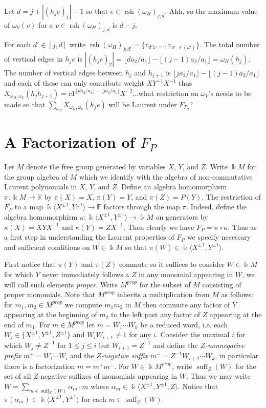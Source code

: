 \documentclass{amsart}
\newcommand{\FF}{\mathbb{F}}
\newcommand{\kk}{\Bbbk}
\newcommand{\KK}{\mathbb{K}}
\newcommand{\rsh}{\operatorname{rsh}}
\newcommand{\suff}{\operatorname{suff}}
\begin{document}
 Let $d=j+|(h_je)_1|-1$ so that $e\in\rsh(\omega_H)_{j;d}$.  Ahh, so the maximum value of $\omega_V(v)$ for a $v\in\rsh(\omega_H)_{j;d}$ is $d-j$.

 For each $d'\in[j,d]$ write $\rsh(\omega_H)_{j;d'}=\{v_{d'1},\ldots,v_{d',\ell(d')}\}$.  The total number of vertical edges in $h_je$ is $|(h_je)_2|=\lfloor da_2/a_1\rfloor-\lfloor (j-1)a_2/a_1\rfloor=\omega_H(h_j)$.  The number of vertical edges between $h_j$ and $h_{j+1}$ is $\lfloor ja_2/a_1\rfloor-\lfloor (j-1)a_2/a_1\rfloor$ and each of these can only contribute weight $XY^{-1}X^{-1}$ thus $X_{\omega_H,\omega_V}(h_jh_{j+1})=cY^{\lfloor da_2/a_1\rfloor-\lfloor ja_2/a_1\rfloor}X^{-2}$...what restriction on $\omega_V$'s needs to be made so that $\sum\limits_{\omega_V} X_{\omega_H,\omega_V}(h_je)$ will be Laurent under $F_{P_2}$?

 
 
\section{A Factorization of $F_P$}
 Let $M$ denote the free group generated by variables $X$, $Y$, and $Z$.  Write $\kk M$ for the group algebra of $M$ which we identify with the algebra of non-commutative Laurent polynomials in $X$, $Y$, and $Z$.  Define an algebra homomorphism $\pi:\kk M\to\KK$ by $\pi(X)=X$, $\pi(Y)=Y$, and $\pi(Z)=P(Y)$.  The restriction of $F_P$ to a map $\kk\langle X^{\pm1},Y^{\pm1}\rangle\to\FF$ factors through the map $\pi$.  Indeed, define the algebra homomorphism $\kappa:\kk\langle X^{\pm1},Y^{\pm1}\rangle\to\kk M$ on generators by $\kappa(X)=XYX^{-1}$ and $\kappa(Y)=ZX^{-1}$.  Then clearly we have $F_P=\pi\circ\kappa$.  Thus as a first step in understanding the Laurent properties of $F_P$ we specify necessary and sufficient conditions on $W\in\kk M$ so that $\pi(W)\in\kk\langle X^{\pm1},Y^{\pm1}\rangle$.  

 First notice that $\pi(Y)$ and $\pi(Z)$ commute so it suffices to consider $W\in\kk M$ for which $Y$ never immediately follows a $Z$ in any monomial appearing in $W$, we will call such elements \emph{proper}.  Write $M^{prop}$ for the subset of $M$ consisting of proper monomials.  Note that $M^{prop}$ inherits a multiplication from $M$ as follows: for $m_1,m_2\in M^{prop}$ we compute $m_1m_2$ in $M$ then commute any factor of $Y$ appearing at the beginning of $m_2$ to the left past any factor of $Z$ appearing at the end of $m_1$.  For $m\in M^{prop}$ let $m=W_1\cdots W_k$ be a reduced word, i.e. each $W_i\in\{X^{\pm1},Y^{\pm1},Z^{\pm1}\}$ and $W_iW_{i+1}\ne1$ for any $i$.  Consider the maximal $i$ for which $W_j\ne Z^{-1}$ for $1\le j\le i$ but $W_{i+1}=Z^{-1}$ and define the \emph{$Z$-nonnegative prefix} $m^+=W_1\cdots W_i$ and the \emph{$Z$-negative suffix} $m^-=Z^{-1}W_{i+2}\cdots W_k$, in particular there is a factorization $m=m^+m^-$.  For $W\in\kk M^{prop}$, write $\suff_Z(W)$ for the set of all $Z$-negative suffixes of monomials appearing in $W$.  Thus we may write $W=\sum\limits_{m\in\suff_Z(W)} \alpha_m\cdot m$ where $\alpha_m\in\kk\langle X^{\pm1},Y^{\pm1},Z\rangle$.  Notice that $\pi(\alpha_m)\in\kk\langle X^{\pm1},Y^{\pm1}\rangle$ for each $m\in\suff_Z(W)$.  
 
\end{document}
